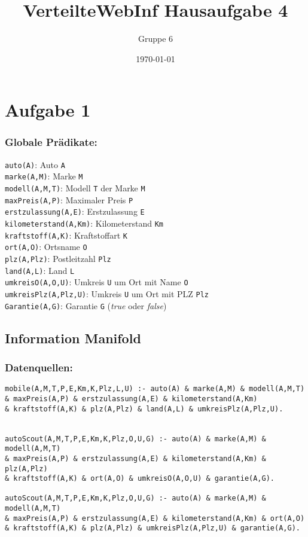 \documentclass[a4paper]{article}
\author{Gruppe 6}
\title{\textbf{VerteilteWebInf Hausaufgabe 4}}
\date{\today}
\begin{document}
\maketitle


\section*{Aufgabe 1}

\subsubsection*{Globale Prädikate:}
\texttt{auto(A)}: Auto \texttt{A}\\
\texttt{marke(A,M)}: Marke \texttt{M} \\
\texttt{modell(A,M,T)}: Modell \texttt{T} der Marke \texttt{M}\\
\texttt{maxPreis(A,P)}: Maximaler Preis \texttt{P} \\
\texttt{erstzulassung(A,E)}: Erstzulassung \texttt{E} \\
\texttt{kilometerstand(A,Km)}: Kilometerstand \texttt{Km}\\
\texttt{kraftstoff(A,K)}: Kraftstoffart \texttt{K}\\
\texttt{ort(A,O)}: Ortsname \texttt{O}\\
\texttt{plz(A,Plz)}: Postleitzahl \texttt{Plz}\\
\texttt{land(A,L)}: Land \texttt{L}\\
\texttt{umkreisO(A,O,U)}: Umkreis \texttt{U} um Ort mit Name \texttt{O}\\
\texttt{umkreisPlz(A,Plz,U)}: Umkreis \texttt{U} um Ort mit PLZ \texttt{Plz} \\
\texttt{Garantie(A,G)}: Garantie \texttt{G} (\emph{true} oder \emph{false})\\


\subsection*{Information Manifold}


\subsubsection*{Datenquellen:}
\begin{verbatim}
mobile(A,M,T,P,E,Km,K,Plz,L,U) :- auto(A) & marke(A,M) & modell(A,M,T) 
& maxPreis(A,P) & erstzulassung(A,E) & kilometerstand(A,Km) 
& kraftstoff(A,K) & plz(A,Plz) & land(A,L) & umkreisPlz(A,Plz,U).


autoScout(A,M,T,P,E,Km,K,Plz,O,U,G) :- auto(A) & marke(A,M) & modell(A,M,T) 
& maxPreis(A,P) & erstzulassung(A,E) & kilometerstand(A,Km) & plz(A,Plz)
& kraftstoff(A,K) & ort(A,O) & umkreisO(A,O,U) & garantie(A,G).

autoScout(A,M,T,P,E,Km,K,Plz,O,U,G) :- auto(A) & marke(A,M) & modell(A,M,T) 
& maxPreis(A,P) & erstzulassung(A,E) & kilometerstand(A,Km) & ort(A,O)
& kraftstoff(A,K) & plz(A,Plz) & umkreisPlz(A,Plz,U) & garantie(A,G).
\end{verbatim}
\end{document}
